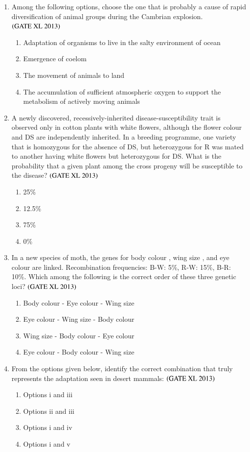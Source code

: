 \documentclass[journal]{IEEEtran}
\begin{document}
\begin{enumerate}
\item Among the following options, choose the one that is probably a cause of rapid diversification of animal groups during the Cambrian explosion. \hfill $\left(\text{GATE XL 2013}\right)$
\begin{enumerate}
    \item Adaptation of organisms to live in the salty environment of ocean
    \item Emergence of coelom
    \item The movement of animals to land
    \item The accumulation of sufficient atmospheric oxygen to support the metabolism of actively moving animals
\end{enumerate}

\item A newly discovered, recessively-inherited disease-susceptibility trait  is observed only in cotton plants with white flowers, although the flower colour  and DS are independently inherited. In a breeding programme, one variety that is homozygous for the absence of DS, but heterozygous for R was mated to another having white flowers but heterozygous for DS. What is the probability that a given plant among the cross progeny will be susceptible to the disease? \hfill $\left(\text{GATE XL 2013}\right)$
\begin{enumerate}
    \item 25\%
    \item 12.5\%
    \item 75\%
    \item 0\%
\end{enumerate}

\item In a new species of moth, the genes for body colour , wing size , and eye colour  are linked. Recombination frequencies: B-W: 5\%, R-W: 15\%, B-R: 10\%. Which among the following is the correct order of these three genetic loci? \hfill $\left(\text{GATE XL 2013}\right)$
\begin{enumerate}
    \item Body colour - Eye colour - Wing size
    \item Eye colour - Wing size - Body colour
    \item Wing size - Body colour - Eye colour
    \item Eye colour - Body colour - Wing size
\end{enumerate}

\item From the options given below, identify the correct combination that truly represents the adaptation seen in desert mammals: \hfill $\left(\text{GATE XL 2013}\right)$
\begin{enumerate}
    \item Options i and iii
    \item Options ii and iii
    \item Options i and iv
    \item Options i and v
\end{enumerate}


\end{enumerate}
\end{document}
